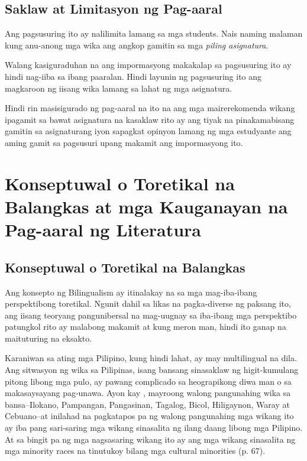 \documentclass [british, 11pt] {report}
\begin{document}
\pagebreak
\section {Saklaw at Limitasyon ng Pag-aaral}
Ang pagsusuring ito ay nalilimita lamang sa mga \glspl{student}. Nais
naming malaman kung anu-anong mga wika ang angkop gamitin sa mga \emph{piling
  asignatura}.

Walang kasiguraduhan na ang impormasyong makakalap sa pagsusuring ito ay hindi
nag-iiba sa ibang paaralan. Hindi layunin ng pagsusuring ito ang magkaroon ng
iisang wika lamang sa lahat ng mga asignatura.

Hindi rin masisigurado ng pag-aaral na ito na ang mga mairerekomenda wikang
ipagamit sa bawat asignatura na kasaklaw rito ay ang tiyak na pinakamabisang
gamitin sa asignaturang iyon sapagkat opinyon lamang ng mga estudyante ang aming
gamit sa pagsusuri upang makamit ang impormasyong ito.

\printglossary

\chapter{Konseptuwal o Toretikal na Balangkas at mga Kauganayan na Pag-aaral ng Literatura}
\section {Konseptuwal o Toretikal na Balangkas}
Ang konsepto ng Bilingualism ay itinalakay na sa mga mag-iba-ibang perspektibong
toretikal. Ngunit dahil sa likas na pagka-diverse ng paksang ito, ang iisang
teoryang pangunibersal na mag-uugnay sa iba-ibang mga perspektibo patungkol rito
ay malabong makamit at kung meron man, hindi ito ganap na maituturing na
eksakto.

Karaniwan sa ating mga Pilipino, kung hindi lahat, ay may multilingual na dila.
Ang sitwasyon ng wika sa Pilipinas, isang bansang sinasaklaw ng higit-kumulang
pitong libong mga pulo, ay pawang complicado sa heograpikong diwa man o sa
makasaysayang pag-unawa. Ayon kay \textcite{KAWAHARA}, mayroong walong pangunahing
wika sa bansa--Ilokano, Pampangan, Pangasinan, Tagalog, Bicol, Hiligaynon, Waray
at Cebuano--at inilahad na pagkatapos pa ng walong pangunahing mga wikang ito ay
iba pang sari-saring mga wikang sinasalita ng ilang daang libong mga Pilipino.
At sa bingit pa ng mga nagsasaring wikang ito ay ang mga wikang sinasalita ng
mga minority races na tinutukoy bilang mga cultural minorities (p. 67).
\end{document}
